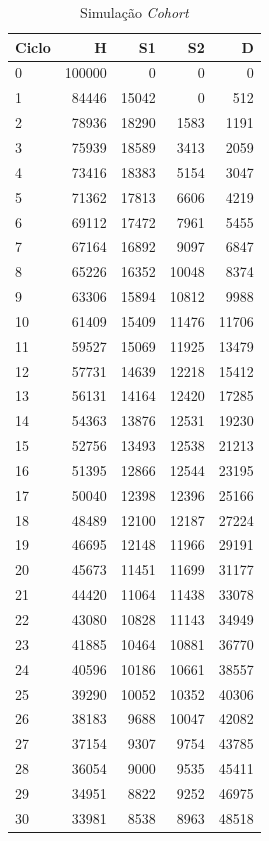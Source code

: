\documentclass[12pt, a4paper, openany]{book}
\numberwithin{equation}{chapter}
\numberwithin{table}{chapter}
\numberwithin{figure}{chapter}
\theoremstyle{break}
\begin{document}
\begin{table}[H]
\centering
\caption{Simulação \textit{Cohort}} 
\label{tab:cohort_no_trt}
\begin{tabular}{lrrrr}
  \hline
Ciclo & H & S1 & S2 & D \\ 
  \hline
0 & 100000 & 0 & 0 & 0 \\ 
1 & 84446 & 15042 & 0 & 512 \\ 
2 & 78936 & 18290 & 1583 & 1191 \\ 
3 & 75939 & 18589 & 3413 & 2059 \\ 
4 & 73416 & 18383 & 5154 & 3047 \\ 
5 & 71362 & 17813 & 6606 & 4219 \\ 
6 & 69112 & 17472 & 7961 & 5455 \\ 
7 & 67164 & 16892 & 9097 & 6847 \\ 
8 & 65226 & 16352 & 10048 & 8374 \\ 
9 & 63306 & 15894 & 10812 & 9988 \\ 
10 & 61409 & 15409 & 11476 & 11706 \\ 
11 & 59527 & 15069 & 11925 & 13479 \\ 
12 & 57731 & 14639 & 12218 & 15412 \\ 
13 & 56131 & 14164 & 12420 & 17285 \\ 
14 & 54363 & 13876 & 12531 & 19230 \\ 
15 & 52756 & 13493 & 12538 & 21213 \\ 
16 & 51395 & 12866 & 12544 & 23195 \\ 
17 & 50040 & 12398 & 12396 & 25166 \\ 
18 & 48489 & 12100 & 12187 & 27224 \\ 
19 & 46695 & 12148 & 11966 & 29191 \\ 
20 & 45673 & 11451 & 11699 & 31177 \\ 
21 & 44420 & 11064 & 11438 & 33078 \\ 
22 & 43080 & 10828 & 11143 & 34949 \\ 
23 & 41885 & 10464 & 10881 & 36770 \\ 
24 & 40596 & 10186 & 10661 & 38557 \\ 
25 & 39290 & 10052 & 10352 & 40306 \\ 
26 & 38183 & 9688 & 10047 & 42082 \\ 
27 & 37154 & 9307 & 9754 & 43785 \\ 
28 & 36054 & 9000 & 9535 & 45411 \\ 
29 & 34951 & 8822 & 9252 & 46975 \\ 
30 & 33981 & 8538 & 8963 & 48518 \\ 
   \hline
\end{tabular}
\end{table}
\end{document}
